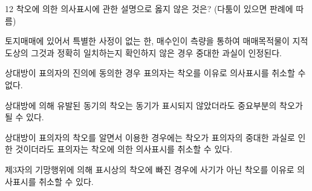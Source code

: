 \begin{question}{12}
착오에 의한 의사표시에 관한 설명으로 옳지 않은 것은? (다툼이 있으면 판례에 따름)
\begin{choices}
  \item 토지매매에 있어서 특별한 사정이 없는 한, 매수인이 측량을 통하여 매매목적물이 지적도상의 그것과 정확히 일치하는지 확인하지 않은 경우 중대한 과실이 인정된다.
  \item 상대방이 표의자의 진의에 동의한 경우 표의자는 착오를 이유로 의사표시를 취소할 수 없다.
  \item 상대방에 의해 유발된 동기의 착오는 동기가 표시되지 않았더라도 중요부분의 착오가 될 수 있다.
  \item 상대방이 표의자의 착오를 알면서 이용한 경우에는 착오가 표의자의 중대한 과실로 인한 것이더라도 표의자는 착오에 의한 의사표시를 취소할 수 있다.
  \item 제3자의 기망행위에 의해 표시상의 착오에 빠진 경우에 사기가 아닌 착오를 이유로 의사표시를 취소할 수 있다.
\end{choices}
\end{question}
